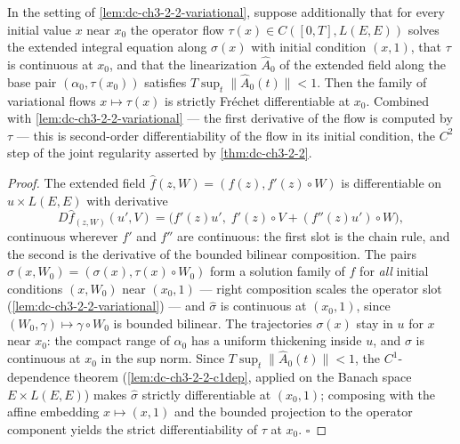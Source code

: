 \begin{lemma}
  \label{lem:dc-ch3-2-2-c2dep}
  \leanok
  In the setting of \cref{lem:dc-ch3-2-2-variational}, suppose additionally
  that for every initial value $x$ near $x_0$ the operator flow
  $\tau(x) \in C([0,T], L(E,E))$ solves the extended integral equation along
  $\sigma(x)$ with initial condition $(x, 1)$, that $\tau$ is continuous at
  $x_0$, and that the linearization $\hat A_0$ of the extended field along the
  base pair $(\alpha_0, \tau(x_0))$ satisfies $T \sup_t \|\hat A_0(t)\| < 1$.
  Then the family of variational flows $x \mapsto \tau(x)$ is strictly
  Fr\'echet differentiable at $x_0$. Combined with
  \cref{lem:dc-ch3-2-2-variational} — the first derivative of the flow is
  computed by $\tau$ — this is second-order differentiability of the flow in
  its initial condition, the $C^2$ step of the joint regularity asserted by
  \cref{thm:dc-ch3-2-2}.
\end{lemma}
\begin{proof}
  \leanok
  The extended field $\hat f(z, W) = (f(z), f'(z) \circ W)$ is differentiable
  on $u \times L(E,E)$ with derivative
  $$D\hat f_{(z,W)}(u', V) = \big(f'(z)u',\; f'(z) \circ V
    + (f''(z)u') \circ W\big),$$
  continuous wherever $f'$ and $f''$ are continuous: the first slot is the
  chain rule, and the second is the derivative of the bounded bilinear
  composition. The pairs $\hat\sigma(x, W_0) = (\sigma(x), \tau(x) \circ W_0)$
  form a solution family of $\hat f$ for \emph{all} initial conditions
  $(x, W_0)$ near $(x_0, 1)$ — right composition scales the operator slot
  (\cref{lem:dc-ch3-2-2-variational}) — and $\hat\sigma$ is continuous at
  $(x_0, 1)$, since $(W_0, \gamma) \mapsto \gamma \circ W_0$ is bounded
  bilinear. The trajectories $\sigma(x)$ stay in $u$ for $x$ near $x_0$: the
  compact range of $\alpha_0$ has a uniform thickening inside $u$, and
  $\sigma$ is continuous at $x_0$ in the sup norm. Since
  $T \sup_t \|\hat A_0(t)\| < 1$, the $C^1$-dependence theorem
  (\cref{lem:dc-ch3-2-2-c1dep}, applied on the Banach space
  $E \times L(E,E)$) makes $\hat\sigma$ strictly differentiable at $(x_0, 1)$;
  composing with the affine embedding $x \mapsto (x, 1)$ and the bounded
  projection to the operator component yields the strict differentiability of
  $\tau$ at $x_0$. $\square$
\end{proof}

